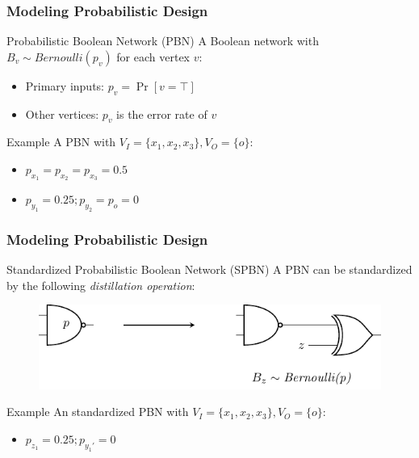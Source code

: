 \begin{frame}
  \frametitle{Modeling Probabilistic Design}
  \begin{block}{Probabilistic Boolean Network (PBN)}
    A Boolean network with $B_v\sim\textit{Bernoulli}(p_v)$ for each vertex $v$:
    \pause
    \begin{itemize}
      \item Primary inputs: $p_v=\Pr[v=\top]$
            \pause
      \item Other vertices: $p_v$ is the error rate of $v$
    \end{itemize}
  \end{block}
  \pause
  \begin{block}{Example}
    A PBN with $V_I=\{x_1,x_2,x_3\},V_O=\{o\}$:
    \begin{figure}
      \centering
      
    \end{figure}
    \pause
    \begin{itemize}
      \item $p_{x_1}=p_{x_2}=p_{x_3}=0.5$
            \pause
      \item $p_{y_1}=0.25;p_{y_2}=p_{o}=0$
    \end{itemize}
  \end{block}
\end{frame}

\begin{frame}
  \frametitle{Modeling Probabilistic Design}
  \begin{block}{Standardized Probabilistic Boolean Network (SPBN)}
    A PBN can be standardized by the following \textit{distillation operation}:
    \pause
    \begin{figure}
      \centering
      \includegraphics[scale=0.8]{fig/prob-distillation.pdf}
    \end{figure}
  \end{block}
  \pause
  \begin{block}{Example}
    An standardized PBN with $V_I=\{x_1,x_2,x_3\},V_O=\{o\}$:
    \begin{figure}
      \centering
      
    \end{figure}
    \pause
    \begin{itemize}
      \item $p_{z_1}=0.25;p_{y_1'}=0$
    \end{itemize}
  \end{block}
\end{frame}